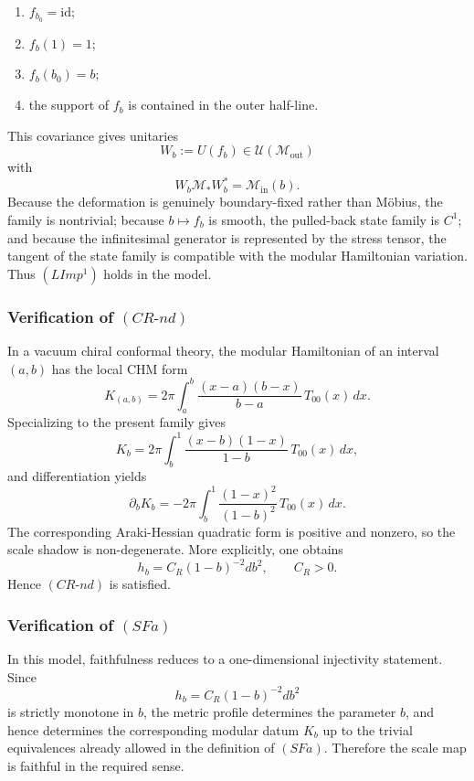 \documentclass[12pt]{article}
\theoremstyle{definition}
\theoremstyle{remark}
\newcommand{\tightlist}{%
  \setlength{\itemsep}{0pt}\setlength{\parskip}{0pt}}
\begin{document}
\begin{enumerate}
\def\labelenumi{\arabic{enumi}.}
\tightlist
\item
  \(f_{b_0}=\mathrm{id}\);
\item
  \(f_b(1)=1\);
\item
  \(f_b(b_0)=b\);
\item
  the support of \(f_b\) is contained in the outer half-line.
\end{enumerate}

This covariance gives unitaries \[
W_b:=U(f_b)\in\mathcal{U}(\mathcal{M}_{\mathrm{out}})
\] with \[
W_b\mathcal{M}_*W_b^*=\mathcal{M}_{\mathrm{in}}(b).
\] Because the deformation is genuinely boundary-fixed rather than
Möbius, the family is nontrivial; because \(b\mapsto f_b\) is smooth,
the pulled-back state family is \(C^1\); and because the infinitesimal
generator is represented by the stress tensor, the tangent of the state
family is compatible with the modular Hamiltonian variation. Thus
\((LImp^1)\) holds in the model.

\subsubsection{\texorpdfstring{Verification of
\((CR\text{-}nd)\)}{Verification of (CR\textbackslash text\{-\}nd)}}\label{verification-of-crtext-nd}

In a vacuum chiral conformal theory, the modular Hamiltonian of an
interval \((a,b)\) has the local CHM form~\cite{CasiniHuertaMyers2011} \[
K_{(a,b)}
=
2\pi\int_a^b
\frac{(x-a)(b-x)}{b-a}\,
T_{00}(x)\,dx.
\] Specializing to the present family gives \[
K_b
=
2\pi\int_b^1
\frac{(x-b)(1-x)}{1-b}\,
T_{00}(x)\,dx,
\] and differentiation yields \[
\partial_b K_b
=
-2\pi\int_b^1
\frac{(1-x)^2}{(1-b)^2}\,
T_{00}(x)\,dx.
\] The corresponding Araki-Hessian quadratic form is positive and
nonzero, so the scale shadow is non-degenerate. More explicitly, one
obtains \[
h_b
=
C_R(1-b)^{-2}db^2,
\qquad
C_R>0.
\] Hence \((CR\text{-}nd)\) is satisfied.

\subsubsection{\texorpdfstring{Verification of
\((SFa)\)}{Verification of (SFa)}}\label{verification-of-sfa}

In this model, faithfulness reduces to a one-dimensional injectivity
statement. Since \[
h_b=C_R(1-b)^{-2}db^2
\] is strictly monotone in \(b\), the metric profile determines the
parameter \(b\), and hence determines the corresponding modular datum
\(K_b\) up to the trivial equivalences already allowed in the definition
of \((SFa)\). Therefore the scale map is faithful in the required sense.
\end{document}
